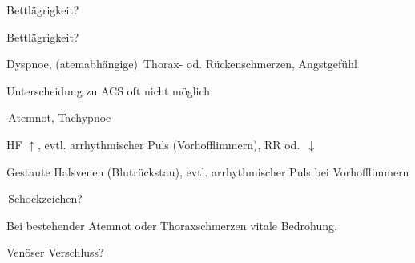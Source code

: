 \documentclass[
ngerman,
paper=a4,
asymmetric,
fontsize=10pt,
draft=false,
numbers=noenddot,
bibtotocnumbered,
footnotes=multiple,
]{scrreprt}
\newcommand{\RedFlag}{{\color{DefaultRed}\scriptsize{\VarFlag}\hspace{-0.5em}}}
\begin{document}
 {
 \begin{ABCDESlide}
  \item[\ABCDE{1}] Bettlägrigkeit?
  \item[\ABCDE{2}] Bettlägrigkeit?
  \item[\ABCDE{4}] Dyspnoe, (atemabhängige)
  {\RedFlag}\,Thorax- od. Rückenschmerzen, Angstgefühl
  
  Unterscheidung zu ACS oft nicht möglich
  \item[\ABCDE{B}] {\RedFlag}\,Atemnot, Tachypnoe
  \item[\ABCDE{C}] HF $\uparrow$, evtl. arrhythmischer Puls
  (Vorhofflimmern), RR \SymbolFindingNormal od.
  {\RedFlag}\,$\downarrow$
 
  Gestaute Halsvenen (Blutrückstau), evtl. arrhythmischer Puls bei Vorhofflimmern
  
  {\RedFlag}\,Schockzeichen?
% 
  \item[\ABCDE{=}] Bei bestehender Atemnot oder
  Thoraxschmerzen vitale Bedrohung.
  \item[\ABCDE{\ldots}] Venöser Verschluss?
 \end{ABCDESlide}
 }
 {}
 {}
 {}
 
\end{document}
